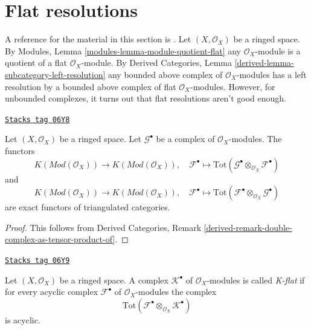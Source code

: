 \section{Flat resolutions}
\label{cohomology-section-flat}
A reference for the material in this section is \cite{Spaltenstein}.
Let $(X, \mathcal{O}_X)$ be a ringed space. By
Modules, Lemma \ref{modules-lemma-module-quotient-flat}
any $\mathcal{O}_X$-module is a quotient of a flat $\mathcal{O}_X$-module.
By
Derived Categories, Lemma \ref{derived-lemma-subcategory-left-resolution}
any bounded above complex of $\mathcal{O}_X$-modules has a left
resolution by a bounded above complex of flat $\mathcal{O}_X$-modules.
However, for unbounded complexes, it turns out that flat resolutions
aren't good enough.

\begin{lemma}
\label{cohomology-lemma-derived-tor-exact}
\href{https://stacks.math.columbia.edu/tag/06Y8}{\texttt{Stacks tag 06Y8}}

Let $(X, \mathcal{O}_X)$ be a ringed space.
Let $\mathcal{G}^\bullet$ be a complex of $\mathcal{O}_X$-modules.
The functors
$$
K(\textit{Mod}(\mathcal{O}_X))
\longrightarrow
K(\textit{Mod}(\mathcal{O}_X)),
\quad
\mathcal{F}^\bullet \longmapsto
\text{Tot}(\mathcal{G}^\bullet \otimes_{\mathcal{O}_X} \mathcal{F}^\bullet)
$$
and
$$
K(\textit{Mod}(\mathcal{O}_X))
\longrightarrow
K(\textit{Mod}(\mathcal{O}_X)),
\quad
\mathcal{F}^\bullet \longmapsto
\text{Tot}(\mathcal{F}^\bullet \otimes_{\mathcal{O}_X} \mathcal{G}^\bullet)
$$
are exact functors of triangulated categories.
\end{lemma}

\begin{proof}
This follows from Derived Categories, Remark
\ref{derived-remark-double-complex-as-tensor-product-of}.
\end{proof}

\begin{definition}[K flat]
\label{cohomology-definition-K-flat}
\href{https://stacks.math.columbia.edu/tag/06Y9}{\texttt{Stacks tag 06Y9}}

Let $(X, \mathcal{O}_X)$ be a ringed space.
A complex $\mathcal{K}^\bullet$ of $\mathcal{O}_X$-modules is
called {\it K-flat} if for every acyclic complex $\mathcal{F}^\bullet$
of $\mathcal{O}_X$-modules the complex
$$
\text{Tot}(\mathcal{F}^\bullet \otimes_{\mathcal{O}_X} \mathcal{K}^\bullet)
$$
is acyclic.
\end{definition}

